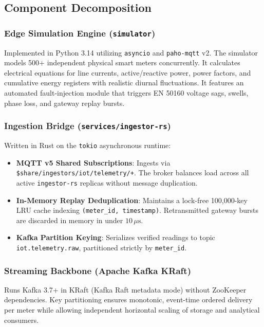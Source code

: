 \documentclass[11pt,a4paper]{article}
\begin{document}
\subsection{Component Decomposition}

\subsubsection{Edge Simulation Engine (\texttt{simulator})}
Implemented in Python 3.14 utilizing \texttt{asyncio} and \texttt{paho-mqtt} v2. The simulator models 500+ independent physical smart meters concurrently. It calculates electrical equations for line currents, active/reactive power, power factors, and cumulative energy registers with realistic diurnal fluctuations. It features an automated fault-injection module that triggers EN 50160 voltage sags, swells, phase loss, and gateway replay bursts.

\subsubsection{Ingestion Bridge (\texttt{services/ingestor-rs})}
Written in Rust on the \texttt{tokio} asynchronous runtime:
\begin{itemize}
    \item \textbf{MQTT v5 Shared Subscriptions}: Ingests via \texttt{\$share/ingestors/iot/telemetry/+}. The broker balances load across all active \texttt{ingestor-rs} replicas without message duplication.
    \item \textbf{In-Memory Replay Deduplication}: Maintains a lock-free 100,000-key LRU cache indexing \texttt{(meter\_id, timestamp)}. Retransmitted gateway bursts are discarded in memory in under $10\,\mu\text{s}$.
    \item \textbf{Kafka Partition Keying}: Serializes verified readings to topic \texttt{iot.\allowbreak telemetry.\allowbreak raw}, partitioned strictly by \texttt{meter\_id}.
\end{itemize}

\subsubsection{Streaming Backbone (Apache Kafka KRaft)}
Runs Kafka 3.7+ in KRaft (Kafka Raft metadata mode) without ZooKeeper dependencies. Key partitioning ensures monotonic, event-time ordered delivery per meter while allowing independent horizontal scaling of storage and analytical consumers.
\end{document}
